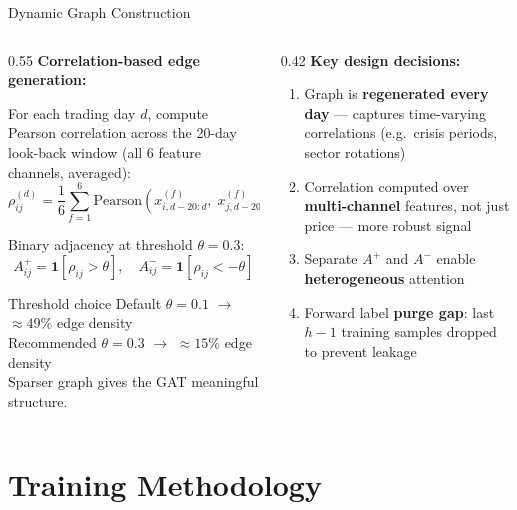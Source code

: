 \documentclass[aspectratio=169, 10pt]{beamer}
\begin{document}
\begin{frame}{Dynamic Graph Construction}
  \begin{columns}[T]
    \begin{column}{0.55\textwidth}
      \textbf{Correlation-based edge generation:}

      For each trading day $d$, compute Pearson correlation across the
      20-day look-back window (all 6 feature channels, averaged):
      \[
        \rho_{ij}^{(d)} = \frac{1}{6}\sum_{f=1}^{6} \text{Pearson}
        \!\left( x_{i,d-20:d}^{(f)},\; x_{j,d-20:d}^{(f)} \right)
      \]

      Binary adjacency at threshold $\theta = 0.3$:
      \[
        A_{ij}^+ = \mathbf{1}[\rho_{ij} > \theta], \quad
        A_{ij}^- = \mathbf{1}[\rho_{ij} < -\theta]
      \]

      \begin{block}{Threshold choice}
        Default $\theta = 0.1$ $\rightarrow$ $\approx 49\%$ edge density\\
        Recommended $\theta = 0.3$ $\rightarrow$ $\approx 15\%$ edge density\\
        Sparser graph gives the GAT meaningful structure.
      \end{block}
    \end{column}
    \begin{column}{0.42\textwidth}
      \textbf{Key design decisions:}
      \begin{enumerate}
        \item Graph is \textbf{regenerated every day} — captures time-varying
              correlations (e.g.\ crisis periods, sector rotations)
        \item Correlation computed over \textbf{multi-channel} features, not
              just price — more robust signal
        \item Separate $A^+$ and $A^-$ enable \textbf{heterogeneous} attention
        \item Forward label \textbf{purge gap}: last $h{-}1$ training samples
              dropped to prevent leakage
      \end{enumerate}
    \end{column}
  \end{columns}
\end{frame}

\section{Training Methodology}
\end{document}
